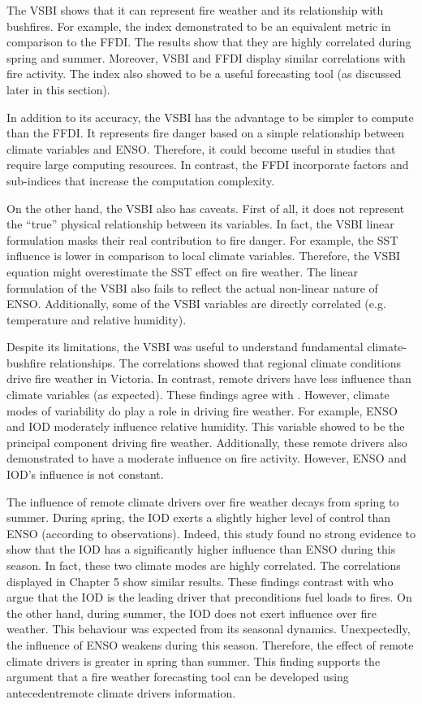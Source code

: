 The VSBI shows that it can represent fire weather and its relationship
with bushfires. For example, the index demonstrated to be an equivalent
metric in comparison to the FFDI. The results show that they are highly
correlated during spring and summer. Moreover, VSBI and FFDI display
similar correlations with fire activity. The index also showed to
be a useful forecasting tool (as discussed later in this section). 

In addition to its accuracy, the VSBI has the advantage to be simpler
to compute than the FFDI. It represents fire danger based on a simple
relationship between climate variables and ENSO. Therefore, it could
become useful in studies that require large computing resources. In
contrast, the FFDI incorporate factors and sub-indices that increase
the computation complexity.

On the other hand, the VSBI also has caveats. First of all, it does
not represent the ``true'' physical relationship between its variables.
In fact, the VSBI linear formulation masks their real contribution
to fire danger. For example, the SST influence is lower in comparison
to local climate variables. Therefore, the VSBI equation might overestimate
the SST effect on fire weather. The linear formulation of the VSBI
also fails to reflect the actual non-linear nature of ENSO. Additionally,
some of the VSBI variables are directly correlated (e.g. temperature
and relative humidity). 

Despite its limitations, the VSBI was useful to understand fundamental
climate-bushfire relationships. The correlations showed that regional
climate conditions drive fire weather in Victoria. In contrast, remote
drivers have less influence than climate variables (as expected).
These findings agree with \citet{Harris2013}. However, climate modes
of variability do play a role in driving fire weather. For example,
ENSO and IOD moderately influence relative humidity. This variable
showed to be the principal component driving fire weather. Additionally,
these remote drivers also demonstrated to have a moderate influence
on fire activity. However, ENSO and IOD's influence is not constant. 

The influence of remote climate drivers over fire weather decays from
spring to summer. During spring, the IOD exerts a slightly higher
level of control than ENSO (according to observations). Indeed, this
study found no strong evidence to show that the IOD has a significantly
higher influence than ENSO during this season. In fact, these two
climate modes are highly correlated. The correlations displayed in
Chapter 5 show similar results. These findings contrast with \citet{Cai2009}
who argue that the IOD is the leading driver that preconditions fuel
loads to fires. On the other hand, during summer, the IOD does not
exert influence over fire weather. This behaviour was expected from
its seasonal dynamics. Unexpectedly, the influence of ENSO weakens
during this season. Therefore, the effect of remote climate drivers
is greater in spring than summer. This finding supports the argument
that a fire weather forecasting tool can be developed using \textemdash antecedent\textemdash remote
climate drivers information. 

